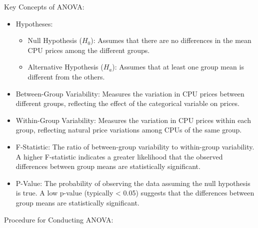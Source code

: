 Key Concepts of ANOVA:
\begin{itemize}
    \item Hypotheses:
    \begin{itemize}
        \item Null Hypothesis ($H_0$): Assumes that there are no differences in the mean CPU prices among the different groups.\\
        
        \item Alternative Hypothesis ($H_a$): Assumes that at least one group mean is different from the others.
    \end{itemize}

    \item Between-Group Variability: Measures the variation in CPU prices between different groups, reflecting the effect of the categorical variable on prices.
    
    \item Within-Group Variability: Measures the variation in CPU prices within each group, reflecting natural price variations among CPUs of the same group.
    
    \item F-Statistic: The ratio of between-group variability to within-group variability. A higher F-statistic indicates a greater likelihood that the observed differences between group means are statistically significant.
    
    \item P-Value: The probability of observing the data assuming the null hypothesis is true. A low p-value (typically < 0.05) suggests that the differences between group means are statistically significant.
\end{itemize}

Procedure for Conducting ANOVA:

